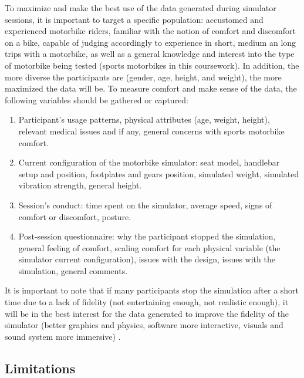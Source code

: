 \documentclass[authoryear,preprint]{sigplanconf}
\begin{document}
To maximize and make the best use of the data generated during simulator sessions, it is important to target a specific population: accustomed and experienced motorbike riders, familiar with the notion of comfort and discomfort on a bike, capable of judging accordingly to experience in short, medium an long trips with a motorbike, as well as a general knowledge and interest into the type of motorbike being tested (sports motorbikes in this coursework). In addition, the more diverse the participants are (gender, age, height, and weight), the more maximized the data will be. To measure comfort and make sense of the data, the following variables should be gathered or captured:
\begin{enumerate}
    \item Participant's usage patterns, physical attributes (age, weight, height), relevant medical issues and if any, general concerns with sports motorbike comfort.
    \item Current configuration of the motorbike simulator: seat model, handlebar setup and position, footplates and gears position, simulated weight, simulated vibration strength, general height.
    \item Session's conduct: time spent on the simulator, average speed, signs of comfort or discomfort, posture.
    \item Post-session questionnaire: why the participant stopped the simulation, general feeling of comfort, scaling comfort for each physical variable (the simulator current configuration), issues with the design, issues with the simulation,  general comments.
\end{enumerate}

It is important to note that if many participants stop the simulation after a short time due to a lack of fidelity (not entertaining enough, not realistic enough), it will be in the best interest for the data generated to improve the fidelity of the simulator (better graphics and physics, software more interactive, visuals and sound system more immersive) \cite{GraphicsFidelity}.

\subsection{Limitations}
\end{document}
